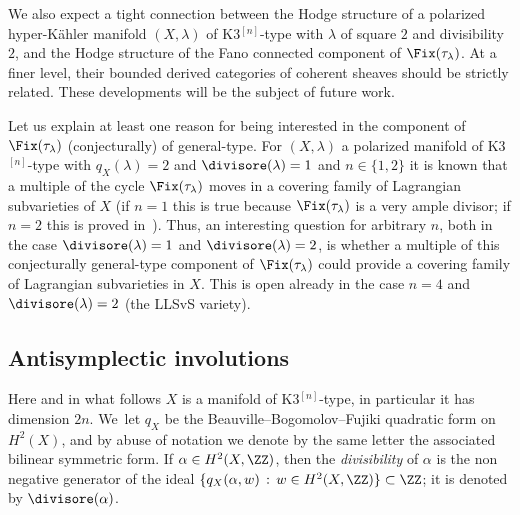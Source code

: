 We also expect a tight connection between the Hodge structure of a polarized hyper-Kähler manifold $(X,\lambda)$
of K3$^{[n]}$-type
with $\lambda$ of square $2$ and divisibility $2$, and the Hodge structure of the Fano connected component of
$\Fix(\tau_{\lambda})$. At a finer level, their bounded derived categories of coherent sheaves should be strictly related. These developments will be the subject of future work.

Let us explain at least one reason for being interested in the component of $\Fix(\tau_{\lambda})$ (conjecturally) of general-type. For $(X,\lambda)$ a polarized \HK manifold of K3$^{[n]}$-type with $q_X(\lambda)=2$ and $\divisore(\lambda)=1$ and $n\in\{1,2\}$ it is known that a multiple of the cycle $\Fix(\tau_{\lambda})$ moves in a covering family of Lagrangian subvarieties of $X$ (if $n=1$ this is true because $\Fix(\tau_{\lambda})$ is a very ample divisor; if $n=2$ this is proved in~\cite{Ferretti:thesis,Kieran:LagrangianCovering}). Thus,
an interesting question for arbitrary $n$, both in the case $\divisore(\lambda)=1$ and \hbox{$\divisore(\lambda)=2$}, is whether a multiple of this conjecturally general-type component of $\Fix(\tau_{\lambda})$ could provide a
covering family of Lagrangian subvarieties in $X$.
This is open already in the case $n=4$ and $\divisore(\lambda)=2$ (the LLSvS variety).

\subsection{Antisymplectic involutions}\label{subsec:AntisymplecticIntro}

Here and in what follows $X$ is a \HK manifold of K3$^{[n]}$-type, in particular it has dimension $2n$. We~let $q_X$ be the Beauville--Bogomolov--Fujiki quadratic form on $H^2(X)$, and by abuse of notation we denote by the same letter the associated bilinear symmetric form.
If $\alpha\in H^2(X,\ZZ)$, then the \emph{divisibility} of $\alpha$ is the non negative generator of the ideal $\{q_X(\alpha,w)\,:\,w\in H^2(X,\ZZ)\}\subset\ZZ$; it is denoted by $\divisore(\alpha)$.

